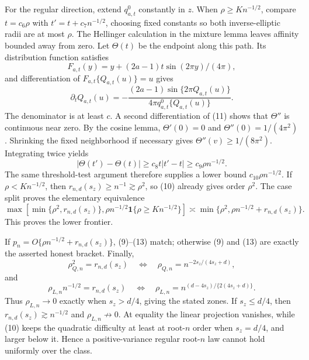 For the regular direction, extend \(q_{a,t}^{0}\) constantly in \(z\). When \(\rho\ge K n^{-1/2}\), compare \(t=c_6\rho\) with \(t'=t+c_7n^{-1/2}\), choosing fixed constants so both inverse-elliptic radii are at most \(\rho\). The Hellinger calculation in the mixture lemma leaves affinity bounded away from zero. Let \(\Theta(t)\) be the endpoint along this path. Its distribution function satisfies
\[
F_{a,t}(y)=y+(2a-1)t\sin(2\pi y)/(4\pi),
\]
and differentiation of \(F_{a,t}\{Q_{a,t}(u)\}=u\) gives
\[
\partial_tQ_{a,t}(u)=
-\frac{(2a-1)\sin\{2\pi Q_{a,t}(u)\}}
{4\pi q_{a,t}^0\{Q_{a,t}(u)\}}.                      \tag{11}
\]
The denominator is at least \(c\). A second differentiation of (11) shows that \(\Theta''\) is continuous near zero. By the cosine lemma, \(\Theta'(0)=0\) and \(\Theta''(0)=1/(4\pi^2)\). Shrinking the fixed neighborhood if necessary gives \(\Theta''(v)\ge1/(8\pi^2)\). Integrating twice yields
\[
|\Theta(t')-\Theta(t)|
\ge c_8t|t'-t|\ge c_9\rho n^{-1/2}.                  \tag{12}
\]
The same threshold-test argument therefore supplies a lower bound \(c_{10}\rho n^{-1/2}\). If \(\rho<Kn^{-1/2}\), then \(r_{n,d}(s_z)\ge n^{-1}\gtrsim\rho^2\), so (10) already gives order \(\rho^2\). The case split proves the elementary equivalence
\[
\max\!\left[\min\{\rho^2,r_{n,d}(s_z)\},
\rho n^{-1/2}\mathbf1\{\rho\ge Kn^{-1/2}\}\right]
\asymp
\min\{\rho^2,\rho n^{-1/2}+r_{n,d}(s_z)\}.            \tag{13}
\]
This proves the lower frontier.

If \(p_n=O\{\rho n^{-1/2}+r_{n,d}(s_z)\}\), (9)--(13) match; otherwise (9) and (13) are exactly the asserted honest bracket. Finally,
\[
\rho_{Q,n}^2=r_{n,d}(s_z)
\quad\Longleftrightarrow\quad
\rho_{Q,n}=n^{-2s_z/(4s_z+d)},
\]
and
\[
\rho_{L,n}n^{-1/2}=r_{n,d}(s_z)
\quad\Longleftrightarrow\quad
\rho_{L,n}=n^{(d-4s_z)/\{2(4s_z+d)\}}.
\]
Thus \(\rho_{L,n}\to0\) exactly when \(s_z>d/4\), giving the stated zones. If \(s_z\le d/4\), then \(r_{n,d}(s_z)\gtrsim n^{-1/2}\) and \(\rho_{L,n}\not\to0\). At equality the linear projection vanishes, while (10) keeps the quadratic difficulty at least at root-\(n\) order when \(s_z=d/4\), and larger below it. Hence a positive-variance regular root-\(n\) law cannot hold uniformly over the class.